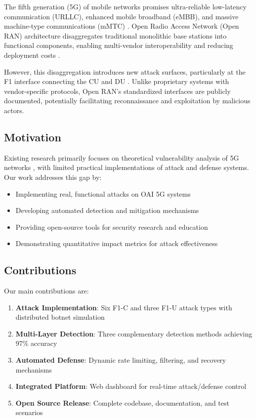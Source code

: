 \documentclass[conference]{IEEEtran}
\begin{document}
The fifth generation (5G) of mobile networks promises ultra-reliable low-latency communication (URLLC), enhanced mobile broadband (eMBB), and massive machine-type communications (mMTC) \cite{3gpp-38.470}. Open Radio Access Network (Open RAN) architecture disaggregates traditional monolithic base stations into functional components, enabling multi-vendor interoperability and reducing deployment costs \cite{oran-alliance}.

However, this disaggregation introduces new attack surfaces, particularly at the F1 interface connecting the CU and DU \cite{security-oran}. Unlike proprietary systems with vendor-specific protocols, Open RAN's standardized interfaces are publicly documented, potentially facilitating reconnaissance and exploitation by malicious actors.

\subsection{Motivation}

Existing research primarily focuses on theoretical vulnerability analysis of 5G networks \cite{survey-5g-security}, with limited practical implementations of attack and defense systems. Our work addresses this gap by:
\begin{itemize}
    \item Implementing real, functional attacks on OAI 5G systems
    \item Developing automated detection and mitigation mechanisms
    \item Providing open-source tools for security research and education
    \item Demonstrating quantitative impact metrics for attack effectiveness
\end{itemize}

\subsection{Contributions}

Our main contributions are:
\begin{enumerate}
    \item \textbf{Attack Implementation}: Six F1-C and three F1-U attack types with distributed botnet simulation
    \item \textbf{Multi-Layer Detection}: Three complementary detection methods achieving 97\% accuracy
    \item \textbf{Automated Defense}: Dynamic rate limiting, filtering, and recovery mechanisms
    \item \textbf{Integrated Platform}: Web dashboard for real-time attack/defense control
    \item \textbf{Open Source Release}: Complete codebase, documentation, and test scenarios
\end{enumerate}
\end{document}
